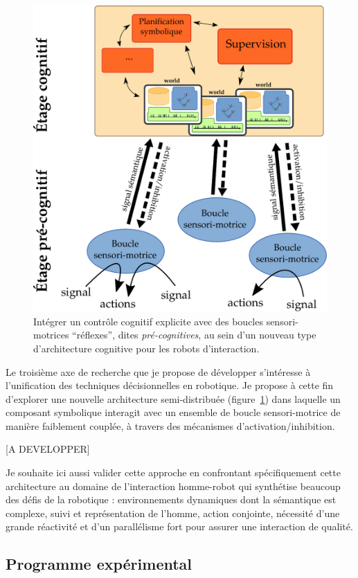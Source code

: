 \documentclass[a4paper]{article}
\begin{document}
\begin{figure}
    \centering
    \includegraphics[width=0.7\linewidth]{archi}
    \caption{\small Intégrer un contrôle cognitif explicite avec des boucles
        sensori-motrices ``réflexes'', dites \emph{pré-cognitives}, au sein
    d'un nouveau type d'architecture cognitive pour les robots d'interaction.}
    \label{archi}
\end{figure}

Le troisième axe de recherche que je propose de développer s'intéresse à
l'unification des techniques décisionnelles en robotique. Je propose à cette fin
d'explorer une nouvelle architecture semi-distribuée (figure~\ref{archi}) dans
laquelle un composant symbolique interagit avec un ensemble de boucle
sensori-motrice de manière faiblement couplée, à travers des mécanismes
d'activation/inhibition.

[A DEVELOPPER]

Je souhaite ici aussi valider cette approche en confrontant spécifiquement cette
architecture au domaine de l'interaction homme-robot qui synthétise beaucoup des
défis de la robotique : environnements dynamiques dont la sémantique est
complexe, suivi et représentation de l'homme, action conjointe, nécessité d'une
grande réactivité et d'un parallélisme fort pour assurer une interaction de
qualité.

\subsection*{Programme expérimental}
\end{document}
